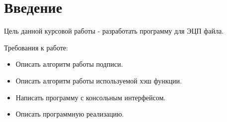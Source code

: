 \section*{Введение}

Цель данной курсовой работы - разработать программу для ЭЦП файла.

Требования к работе:
\begin{itemize}
    \item Описать алгоритм работы подписи.
    \item Описать алгоритм работы используемой хэш функции.
    \item Написать программу с консольным интерфейсом.
    \item Описать программную реализацию.
\end{itemize}